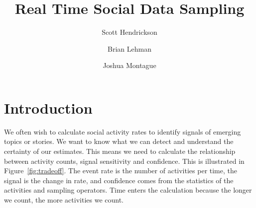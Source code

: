 \documentclass{article}
\title{Real Time Social Data Sampling }
\author[]{Scott Hendrickson}
\author[]{Brian Lehman}
\author[]{Joshua Montague}
\affil[]{ \Large{Gnip, Inc.} }
\begin{document}
\maketitle

\section{Introduction}

We often wish to calculate social activity rates to identify signals of emerging topics or stories.
We want to know what we can detect and understand the certainty of our estimates. This means
we need to calculate the relationship between activity counts, signal sensitivity and confidence. This
is illustrated in Figure~\ref{fig:tradeoff}. The event rate is the number of activities per time,
the signal is the change in rate, and confidence comes from the statistics of the activities and
sampling operators. Time enters the calculation because the longer we count, the more activities
we count.

%
%
%
\end{document}
